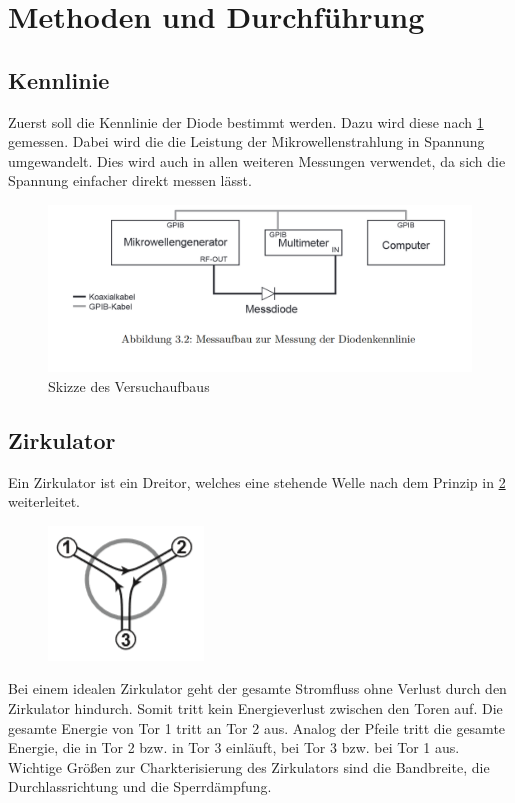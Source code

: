 \section{Methoden und Durchführung}
\subsection{Kennlinie}
Zuerst soll die Kennlinie der Diode bestimmt werden. Dazu wird diese nach \cref{Aufbau} gemessen. Dabei wird die die Leistung der Mikrowellenstrahlung in Spannung umgewandelt. Dies wird auch in allen weiteren Messungen verwendet, da sich die Spannung einfacher direkt messen lässt.

\begin{figure}[h]
	\centering
	\includegraphics[scale=0.4]{Diode_Aufbau.PNG}
	\caption{Skizze des Versuchaufbaus}
	\label{Aufbau}
\end{figure}



\subsection{Zirkulator}
Ein Zirkulator ist ein Dreitor, welches eine stehende Welle nach dem Prinzip in \cref{ZB} weiterleitet.
\begin{figure}[h!]
	\centering
	\includegraphics[scale = 1]{Zirk-Bild.PNG}
	\caption{}
	\label{ZB}
\end{figure}
Bei einem idealen Zirkulator geht der gesamte Stromfluss ohne Verlust  durch den Zirkulator hindurch. Somit tritt kein Energieverlust zwischen den Toren auf. Die gesamte Energie von Tor 1 tritt an Tor 2 aus. Analog der Pfeile tritt die gesamte Energie, die in Tor 2 bzw. in Tor 3 einläuft, bei Tor 3 bzw. bei Tor 1 aus. Wichtige Größen zur Charkterisierung des Zirkulators sind die Bandbreite, die Durchlassrichtung und die Sperrdämpfung.

